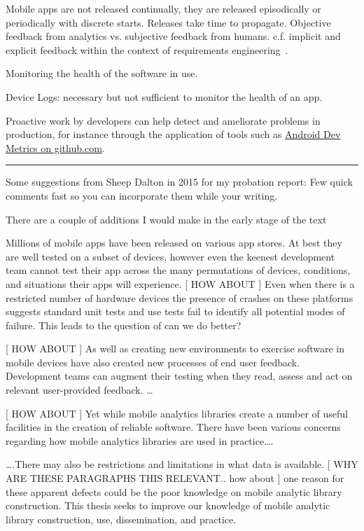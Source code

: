 Mobile apps are not released continually, they are released episodically or periodically with discrete starts. Releases take time to propagate. 
Objective feedback from analytics vs. subjective feedback from humans. c.f. implicit and explicit feedback within the context of requirements engineering~\citep{maalej2016_towards_data_driven_requirements_engineering}.

Monitoring the health of the software in use.

Device Logs: necessary but not sufficient to monitor the health of an app. 

Proactive work by developers can help detect and ameliorate problems in production, for instance through the application of tools such as \href{https://github.com/frogermcs/AndroidDevMetrics}{Android Dev Metrics on github.com}.

\noindent
\rule{\textwidth}{0.4pt}

Some suggestions from Sheep Dalton in 2015 for my probation report:
Few quick comments fast so you can incorporate them while your writing. 

There are a couple of additions I would make in the early stage of the text

Millions of mobile apps have been released on various app stores. At best they are well tested on a subset of devices, however even the keenest development team cannot test their app across the many permutations of devices, conditions, and situations their apps will experience. [ HOW ABOUT ]  Even when there is a restricted number of hardware devices the presence of crashes on these platforms suggests standard unit tests and use tests fail to identify all potential modes of failure. This leads to the question of can we do better? 


[ HOW ABOUT ]  As well as creating new environments to exercise  software in mobile devices have also created new processes of end user feedback. Development teams can augment their testing when they read, assess and act on relevant user-provided feedback. …


[ HOW ABOUT ]  Yet while mobile analytics libraries create a number of useful facilities in the creation of reliable software. There have been various concerns regarding how mobile analytics libraries are used in practice….


….There may also be restrictions and limitations in what data is available. [ WHY ARE THESE PARAGRAPHS THIS RELEVANT.. how about ] one reason for these apparent defects could be the poor knowledge on mobile analytic library construction.  This thesis seeks to improve our knowledge of mobile analytic library construction, use, dissemination, and practice. 


